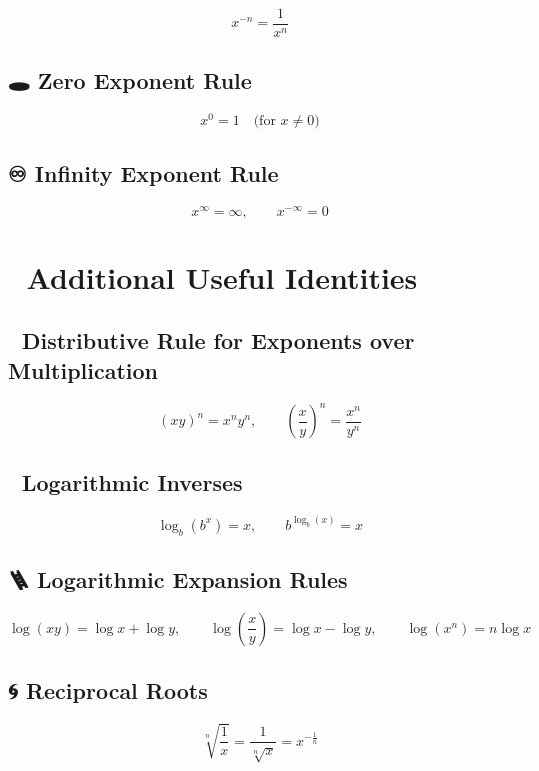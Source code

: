 \documentclass[
  letterpaper,
]{book}
\begin{document}
\[
x^{-n} = \frac{1}{x^n}
\]

\subsection{🕳️ Zero Exponent Rule}\label{zero-exponent-rule}

\[
x^0 = 1 \quad \text{(for } x \ne 0\text{)}
\]

\subsection{♾️ Infinity Exponent Rule}\label{infinity-exponent-rule}

\[
x^\infty = \infty, \qquad x^{-\infty} = 0
\]

\section{🧠 Additional Useful
Identities}\label{additional-useful-identities}

\subsection{🧩 Distributive Rule for Exponents over
Multiplication}\label{distributive-rule-for-exponents-over-multiplication}

\[
(xy)^n = x^n y^n, \qquad \left(\frac{x}{y}\right)^n = \frac{x^n}{y^n}
\]

\subsection{🔄 Logarithmic Inverses}\label{logarithmic-inverses}

\[
\log_b(b^x) = x, \qquad b^{\log_b(x)} = x
\]

\subsection{🪜 Logarithmic Expansion
Rules}\label{logarithmic-expansion-rules}

\[
\log(xy) = \log x + \log y, \qquad \log\left(\frac{x}{y}\right) = \log x - \log y, \qquad \log(x^n) = n \log x
\]

\subsection{🌀 Reciprocal Roots}\label{reciprocal-roots}

\[
\sqrt[n]{\frac{1}{x}} = \frac{1}{\sqrt[n]{x}} = x^{-\frac{1}{n}}
\]
\end{document}
